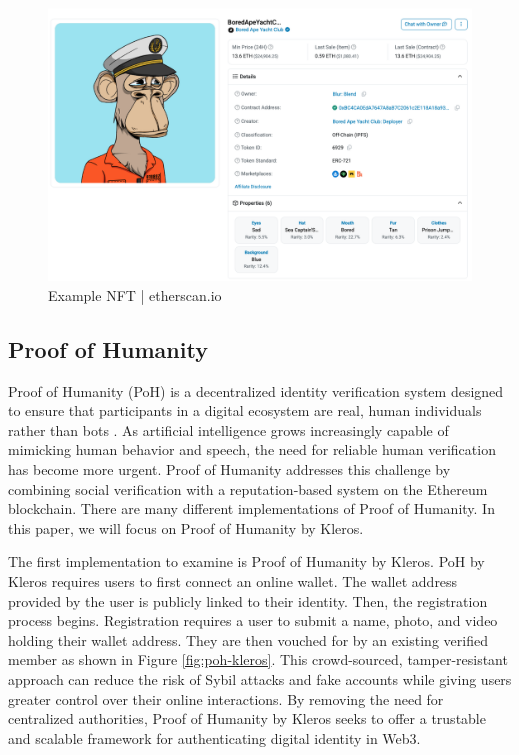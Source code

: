 \documentclass[conference]{IEEEtran}
\begin{document}
\begin{figure}[h!]
    \centering
    \includegraphics[width=0.9\linewidth]{nft-example.png}
    \caption{Example NFT | etherscan.io}
    \label{fig:nft-exp}
\end{figure}

\subsection{Proof of Humanity}
Proof of Humanity (PoH) is a decentralized identity verification system designed to ensure that participants in a digital ecosystem are real, human individuals rather than bots \cite{what-is-poh}. As artificial intelligence grows increasingly capable of mimicking human behavior and speech, the need for reliable human verification has become more urgent. Proof of Humanity addresses this challenge by combining social verification with a reputation-based system on the Ethereum blockchain. There are many different implementations of Proof of Humanity. In this paper, we will focus on Proof of Humanity by Kleros.

The first implementation to examine is Proof of Humanity by Kleros. PoH by Kleros requires users to first connect an online wallet. The wallet address provided by the user is publicly linked to their identity. Then, the registration process begins. Registration requires a user to submit a name, photo, and video holding their wallet address. They are then vouched for by an existing verified member as shown in Figure \ref{fig:poh-kleros}. This crowd-sourced, tamper-resistant approach can reduce the risk of Sybil attacks and fake accounts while giving users greater control over their online interactions. By removing the need for centralized authorities, Proof of Humanity by Kleros seeks to offer a trustable and scalable framework for authenticating digital identity in Web3.
\end{document}
